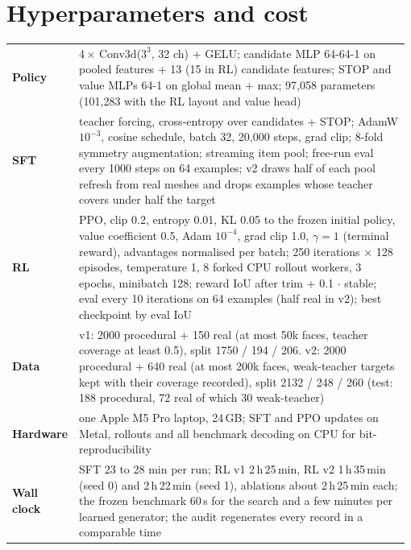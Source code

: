 \section{Hyperparameters and cost}
\label{app:hparams}
\begin{table}[h]
  \centering\small
  \begin{tabular}{@{}p{0.14\linewidth}p{0.84\linewidth}@{}}
    \toprule
    \textbf{Policy} & 4\,$\times$ Conv3d($3^3$, 32 ch) + GELU; candidate MLP 64-64-1 on pooled features + 13 (15 in RL)
    candidate features; STOP and value MLPs 64-1 on global mean + max; 97{,}058 parameters (101{,}283 with the RL
    layout and value head) \\
    \textbf{SFT} & teacher forcing, cross-entropy over candidates + STOP; AdamW $10^{-3}$, cosine schedule, batch 32,
    20{,}000 steps, grad clip; 8-fold symmetry augmentation; streaming item pool; free-run eval every 1000 steps on 64
    examples; v2 draws half of each pool refresh from real meshes and drops examples whose teacher covers under half
    the target \\
    \textbf{RL} & PPO, clip 0.2, entropy 0.01, KL 0.05 to the frozen initial policy, value coefficient 0.5, Adam
    $10^{-4}$, grad clip 1.0, $\gamma = 1$ (terminal reward), advantages normalised per batch; 250 iterations
    $\times$ 128 episodes, temperature 1, 8 forked CPU rollout workers, 3 epochs, minibatch 128; reward IoU after trim
    + 0.1 $\cdot$ stable; eval every 10 iterations on 64 examples (half real in v2); best checkpoint by eval IoU \\
    \textbf{Data} & v1: 2000 procedural + 150 real (at most 50k faces, teacher coverage at least 0.5), split
    1750 / 194 / 206. v2: 2000 procedural + 640 real (at most 200k faces, weak-teacher targets kept with their
    coverage recorded), split 2132 / 248 / 260 (test: 188 procedural, 72 real of which 30 weak-teacher) \\
    \textbf{Hardware} & one Apple M5 Pro laptop, 24\,GB; SFT and PPO updates on Metal, rollouts and all benchmark
    decoding on CPU for bit-reproducibility \\
    \textbf{Wall clock} & SFT 23 to 28 min per run; RL v1 2\,h\,25\,min, RL v2 1\,h\,35\,min (seed 0) and
    2\,h\,22\,min (seed 1), ablations about 2\,h\,25\,min each; the frozen benchmark 60\,s for the search and a few
    minutes per learned generator; the audit regenerates every record in a comparable time \\
    \bottomrule
  \end{tabular}
\end{table}

